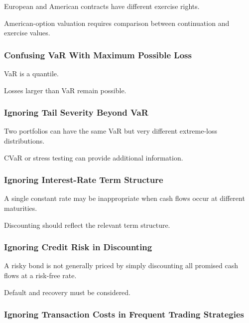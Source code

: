 European and American contracts have different exercise rights.

American-option valuation requires comparison between continuation and
exercise values.

\subsubsection{Confusing VaR With Maximum Possible Loss}

VaR is a quantile.

Losses larger than VaR remain possible.

\subsubsection{Ignoring Tail Severity Beyond VaR}

Two portfolios can have the same VaR but very different extreme-loss
distributions.

CVaR or stress testing can provide additional information.

\subsubsection{Ignoring Interest-Rate Term Structure}

A single constant rate may be inappropriate when cash flows occur at
different maturities.

Discounting should reflect the relevant term structure.

\subsubsection{Ignoring Credit Risk in Discounting}

A risky bond is not generally priced by simply discounting all promised cash
flows at a risk-free rate.

Default and recovery must be considered.

\subsubsection{Ignoring Transaction Costs in Frequent Trading Strategies}

